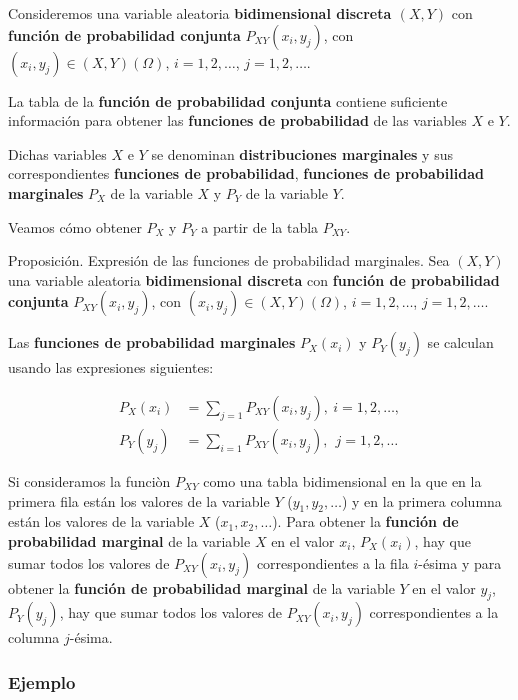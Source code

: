 \documentclass[
  letterpaper,
  DIV=11,
  numbers=noendperiod]{scrreprt}
\begin{document}
Consideremos una variable aleatoria \textbf{bidimensional discreta
\((X,Y)\)} con \textbf{función de probabilidad conjunta}
\(P_{XY}(x_i,y_j)\), con \((x_i,y_j)\in (X,Y)(\Omega)\),
\(i=1,2,\ldots\), \(j=1,2,\ldots\).

La tabla de la \textbf{función de probabilidad conjunta} contiene
suficiente información para obtener las \textbf{funciones de
probabilidad} de las variables \(X\) e \(Y\).

Dichas variables \(X\) e \(Y\) se denominan \textbf{distribuciones
marginales} y sus correspondientes \textbf{funciones de probabilidad},
\textbf{funciones de probabilidad marginales} \(P_X\) de la variable
\(X\) y \(P_Y\) de la variable \(Y\).

Veamos cómo obtener \(P_X\) y \(P_Y\) a partir de la tabla \(P_{XY}\).

Proposición. Expresión de las funciones de probabilidad marginales. Sea
\((X,Y)\) una variable aleatoria \textbf{bidimensional discreta} con
\textbf{función de probabilidad conjunta} \(P_{XY}(x_i,y_j)\), con
\((x_i,y_j)\in (X,Y)(\Omega)\), \(i=1,2,\ldots\), \(j=1,2,\ldots\).

Las \textbf{funciones de probabilidad marginales} \(P_X(x_i)\) y
\(P_Y(y_j)\) se calculan usando las expresiones siguientes:

\[
\begin{array}{rl}
P_X(x_i)  & = \sum_{j=1} P_{XY}(x_i,y_j),\  i=1,2,\ldots,\\ P_Y(y_j) &  = \sum_{i=1} P_{XY}(x_i,y_j),\ \ j=1,2,\ldots
\end{array}
\]

Si consideramos la funciòn \(P_{XY}\) como una tabla bidimensional en la
que en la primera fila están los valores de la variable \(Y\)
(\(y_1,y_2,\ldots\)) y en la primera columna están los valores de la
variable \(X\) (\(x_1,x_2,\ldots\)). Para obtener la \textbf{función de
probabilidad marginal} de la variable \(X\) en el valor \(x_i\),
\(P_X(x_i)\), hay que sumar todos los valores de \(P_{XY}(x_i,y_j)\)
correspondientes a la fila \(i\)-ésima y para obtener la \textbf{función
de probabilidad marginal} de la variable \(Y\) en el valor \(y_j\),
\(P_Y(y_j)\), hay que sumar todos los valores de \(P_{XY}(x_i,y_j)\)
correspondientes a la columna \(j\)-ésima.

\hypertarget{ejemplo}{%
\subsubsection{Ejemplo}\label{ejemplo}}
\end{document}
